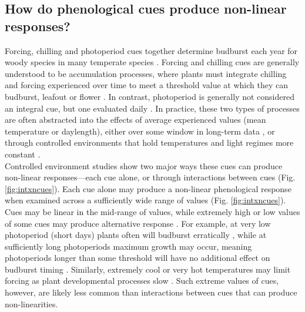 \documentclass[11pt,letter]{article}
\begin{document}
\subsection{How do phenological cues produce non-linear responses?}
Forcing, chilling and photoperiod cues together determine budburst each year for woody species in many temperate species \citep[e.g.,][]{chuinearees,ettinger2020}. Forcing and chilling cues are generally understood to be accumulation processes, where plants must integrate chilling and forcing experienced over time to meet a threshold value at which they can budburst, leafout or flower \citep{Chuine2000}. In contrast, photoperiod is generally not considered an integral cue, but one evaluated daily \citep{Singh:2017}. In practice, these two types of processes are often abstracted into the effects of average experienced values (mean temperature or daylength), either over some window in long-term data \citep[e.g.,][]{Wolkovich:2012n,fu2015}, or through controlled environments that hold temperatures and light regimes more constant \citep[e.g.,][]{Worrall:1967aa,Heide:1993,Heide:1993a,Skuterud:1994aa}. \\

Controlled environment studies show two major ways these cues can produce non-linear responses---each cue alone, or through interactions between cues (Fig. \ref{fig:intxncues}). Each cue alone may produce a non-linear phenological response when examined across a sufficiently wide range of values (Fig. \ref{fig:intxncues}). Cues may be linear in the mid-range of values, while extremely high or low values of some cues may produce alternative response \citep{gauzere2017}. For example, at very low photoperiod (short days) plants often will budburst erratically \citep{Heide:1993,Partanen:1998aa,Singh:2017,rinne2018}, while at sufficiently long photoperiods maximum growth may occur, meaning photoperiods longer than some threshold will have no additional effect on budburst timing \citep[e.g.,][]{major1980}. Similarly, extremely cool or very hot temperatures may limit forcing as plant developmental processes slow \citep{parent2012}. Such extreme values of cues, however, are likely less common than interactions between cues that can produce non-linearities.\\
\end{document}
